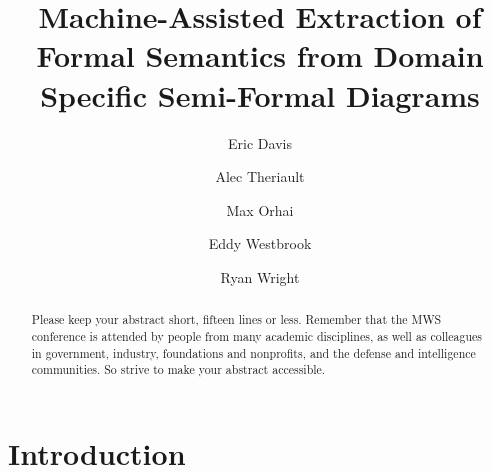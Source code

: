 \documentclass[11pt]{article}
\date{\vspace{-5ex}}
\author[1]{Eric Davis}
\author[1]{Alec Theriault}
\author[1]{Max Orhai}
\author[1]{Eddy Westbrook}
\author[1]{Ryan Wright}
\affil[1]{Galois, Inc}
\title{Machine-Assisted Extraction of Formal Semantics from Domain Specific Semi-Formal Diagrams}
\begin{document}
\maketitle
\vspace{10pt}
\begin{abstract}
Please keep your abstract short, fifteen lines or less.  Remember that the MWS conference is attended by people from many academic disciplines, as well as colleagues in government, industry, foundations and nonprofits, and the defense and intelligence communities.  So strive to make your abstract accessible.
\end{abstract}

\section{Introduction}
\end{document}
